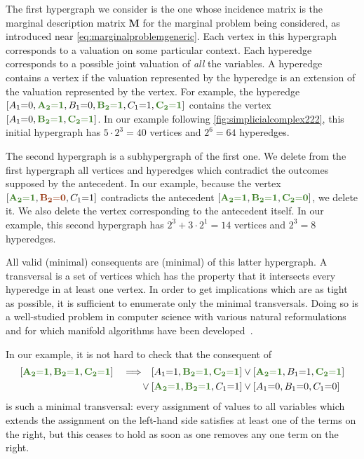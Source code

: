 \documentclass[aps,english,10pt,superscriptaddress,onecolumn,twoside,longbibliography,pra,floatfix,fleqn,nofootinbib]{revtex4-1}
\newcommand*{\mred}[1]{{\color{RawSienna}{\mathbf{#1}}}}
\newcommand*{\mgreen}[1]{{\color{OliveGreen}{\mathbf{#1}}}}
\newcommand*{\tblue}[1]{{\color{MidnightBlue}{\textbf{#1}}}}
\theoremstyle{definition}
\newcounter{example}[section]
\newcommand{\eql}{\mathord{=}}
\DeclarePairedDelimiter{\bracks}{\lbrack}{\rbrack}
\begin{document}
The first hypergraph we consider is the one whose incidence matrix is the marginal description matrix $\bm{M}$ for the marginal problem being considered, as introduced near \cref{eq:marginalproblemgeneric}. 
Each vertex in this hypergraph corresponds to a valuation on some particular context. Each hyperedge corresponds to a possible joint valuation of \emph{all} the variables. A hyperedge contains a vertex if the valuation represented by the hyperedge is an extension of the valuation represented by the vertex. For example, the hyperedge $\bracks{A_1 \eql 0, \mgreen{A_2 \eql 1}, B_1 \eql 0, \mgreen{B_2 \eql 1}, C_1 \eql 1, \mgreen{C_2 \eql 1}}$ contains the vertex $\bracks{A_1 \eql 0,  \mgreen{B_2 \eql 1}, \mgreen{C_2 \eql 1}}$. In our example following \cref{fig:simplicialcomplex222}, this initial hypergraph has $5\cdot 2^3 = 40$ vertices and $2^6 = 64$ hyperedges. 

The second hypergraph is a subhypergraph of the first one. We delete from the first hypergraph all vertices and hyperedges which contradict the outcomes supposed by the antecedent. In our example, because the vertex $\bracks{\mgreen{A_2 \eql 1}, \mred{B_2 \eql 0}, C_1 \eql 1}$ contradicts the antecedent $\bracks{\mgreen{A_2 \eql 1}, \mgreen{B_2 \eql 1}, \mgreen{C_2 \eql 0}}$, we delete it. We also delete the vertex corresponding to the antecedent itself. In our example, this second hypergraph has $2^3 + 3\cdot 2^1 = 14$ vertices and $2^3 = 8$ hyperedges.

All valid (minimal) consequents are (minimal) \tblue{transversals} of this latter hypergraph. A transversal is a set of vertices which has the property that it intersects every hyperedge in at least one vertex. In order to get implications which are as tight as possible, it is sufficient to enumerate only the minimal transversals. Doing so is a well-studied problem in computer science with various natural reformulations and for which manifold algorithms have been developed~\cite{eiter_dualization_2008}.

In our example, it is not hard to check that the consequent of
\begin{align}\begin{split}\label{eq:F3implicationform}
	\bracks{\mgreen{A_2 \eql 1}, \mgreen{B_2 \eql 1}, \mgreen{C_2 \eql 1}}  \quad\Longrightarrow\quad & \bracks{A_1 \eql 1, \mgreen{B_2 \eql 1}, \mgreen{C_2 \eql 1}} \lor \bracks{\mgreen{A_2 \eql 1}, B_1 \eql 1, \mgreen{C_2 \eql 1}} \\
	 \lor\: & \bracks{\mgreen{A_2 \eql 1}, \mgreen{B_2 \eql 1}, C_1 \eql 1} \lor \bracks{A_1 \eql 0, B_1 \eql 0, C_1 \eql 0}
\end{split}\end{align}
is such a minimal transversal: every assignment of values to all variables which extends the assignment on the left-hand side satisfies at least one of the terms on the right, but this ceases to hold as soon as one removes any one term on the right. 
\end{document}
